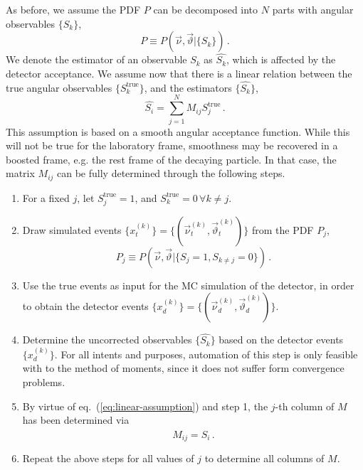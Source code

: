 \documentclass[aps,prd,reprint,nofootinbib,preprintnumbers]{revtex4}
\newcommand{\est}[1]{\widehat{#1}}
\newcommand{\refeq}[1]{eq.~(\ref{eq:#1})}
\renewcommand{\theta}{\vartheta}
\begin{document}
As before, we assume the PDF $P$ can be decomposed into $N$ parts with angular observables $\lbrace S_k\rbrace$,
\begin{equation}
    P \equiv P(\vec\nu,\vec\theta | \lbrace S_k \rbrace)\,.
\end{equation}
We denote the estimator of an
observable $S_k$ as $\est{S_k}$, which is affected by the detector acceptance. We assume now that there is a linear relation
between the true angular observables $\lbrace S_k^\text{true}\rbrace$, and the estimators $\lbrace \est{S_k}\rbrace$,
\begin{equation}
    \label{eq:linear-assumption}
    \est{S_i} = \sum_{j = 1}^N M_{i j} S_j^\text{true}\,.
\end{equation}
This assumption is based on a smooth angular acceptance function. While this will not be true for the laboratory frame,
smoothness may be recovered in a boosted frame, e.g. the rest frame of the decaying particle.
In that case, the matrix $M_{ij}$ can be fully determined through the following steps.
\begin{enumerate}
    \item For a fixed $j$, let $S_j^\text{true} = 1$, and $S_k^\text{true} = 0\,\forall k\neq j$.
    \item Draw simulated events $\lbrace x_t^{(k)}\rbrace = \lbrace(\vec{\nu}^{(k)}_t,\vec\theta^{(k)}_t)\rbrace$ from the PDF $P_j$,
        \begin{equation}
            P_j \equiv P(\vec\nu,\vec\theta | \lbrace S_j = 1, S_{k\neq j} = 0\rbrace)\,.
        \end{equation}
    \item Use the true events as input for the MC simulation of the detector, in order to obtain the detector
        events $\lbrace x^{(k)}_d\rbrace = \lbrace(\vec{\nu}^{(k)}_d,\vec\theta^{(k)}_d)\rbrace$.
    \item Determine the uncorrected observables $\lbrace \est{S_k} \rbrace$ based on the detector
        events $\lbrace x^{(k)}_d\rbrace$. For all intents and purposes, automation of this step is only feasible
        with to the method of moments, since it does not suffer form convergence problems.
    \item By virtue of \refeq{linear-assumption} and step 1, the $j$-th column of $M$ has been determined via
        \begin{equation}
            M_{ij} = \est{S_i}\,.
        \end{equation}
    \item Repeat the above steps for all values of $j$ to determine all columns of $M$.
\end{enumerate}
\end{document}
